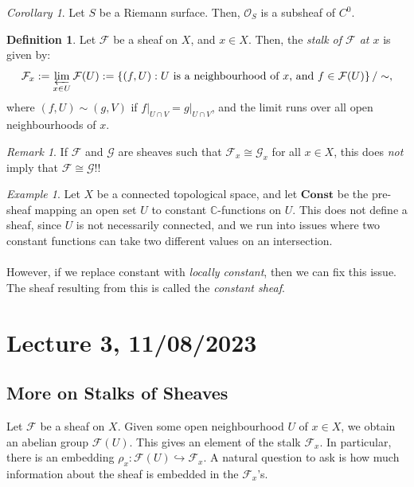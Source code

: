 \documentclass[a4paper]{report}
\theoremstyle{definition}
\newtheorem{definition}{Definition}
\theoremstyle{remark}
\newtheorem{remark}{Remark}
\theoremstyle{proposition}
\theoremstyle{conjecture}
\theoremstyle{lemma}
\theoremstyle{corollary}
\newtheorem{corollary}{Corollary}
\theoremstyle{exercise}
\theoremstyle{example}
\newtheorem{example}{Example}
\newcommand{\C}{\mathbb{C}}
\newcommand{\mcal}{\mathcal}
\begin{document}
\begin{corollary}
    Let $S$ be a Riemann surface. Then, $\mcal{O}_S$ is a subsheaf of $C^0$.
\end{corollary}

\begin{definition}
    Let $\mcal{F}$ be a sheaf on $X$, and $x \in X$.
    Then, the \emph{stalk of $\mcal{F}$ at $x$} is given by:
    $$\mcal{F}_x := \varprojlim_{x \in U}\mcal{F}(U) := \left\lbrace (f,U) : 
    \text{$U$ is a neighbourhood of $x$, and $f \in \mcal{F}(U)$}\right\rbrace/\sim,$$
    where $(f,U)\sim (g,V)$ if $f\vert_{U\cap V} = g\vert_{U\cap V}$, and the 
    limit runs over all open neighbourhoods of $x$.
\end{definition}

\begin{remark}
    If $\mcal{F}$ and $\mcal{G}$ are sheaves such that 
    $\mcal{F}_x \cong \mcal{G}_x$ for all $x \in X$, this does 
    \emph{not} imply that $\mcal{F} \cong \mcal{G}$!!
\end{remark}

\begin{example}
    Let $X$ be a connected topological space, and let 
    $\mathbf{Const}$ be the pre-sheaf mapping an open set $U$ 
    to constant $\C$-functions on $U$. This does not define a sheaf,
    since $U$ is not necessarily connected, and we run into issues
    where two constant functions can take two different values on an 
    intersection.\\\\
    However, if we replace constant with \emph{locally constant}, then we 
    can fix this issue. The sheaf resulting from this is called the 
    \emph{constant sheaf}.
\end{example}

\section{Lecture 3, 11/08/2023}

\subsection{More on Stalks of Sheaves}

Let $\mcal{F}$ be a sheaf on $X$. Given some open neighbourhood $U$ of 
$x \in X$, we obtain an abelian group $\mcal{F}(U)$. This gives an element
of the stalk $\mcal{F}_x$. In particular, there is an embedding 
$\rho_x : \mcal{F}(U) \hookrightarrow\mcal{F}_x$. A natural 
question to ask is how much information about the sheaf is embedded in the
$\mcal{F}_x$'s.
\end{document}
